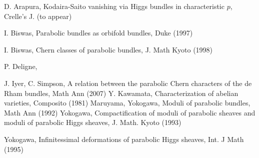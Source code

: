 \documentclass{amsart}
\begin{document}
 \begin{thebibliography}{99}
  D. Arapura, Kodaira-Saito vanishing via Higgs bundles in
   characteristic $p$, Crelle's J. (to appear)

  I. Biswas, Parabolic bundles as orbifold bundles,
   Duke (1997)

  I. Biswas, Chern classes of parabolic bundles,
   J. Math Kyoto (1998)
   
    P. Deligne,
   
   
  J. Iyer, C. Simpson, A relation between the
   parabolic Chern characters of the de Rham bundles, Math Ann (2007)
  Y. Kawamata, Characterization of abelian
   varieties, Composito (1981)
  Maruyama, Yokogawa, Moduli of parabolic bundles,
   Math Ann (1992)
  Yokogawa, Compactification of moduli of parabolic sheaves and
moduli of parabolic Higgs sheaves, J. Math. Kyoto (1993)

 Yokogawa, Infinitessimal deformations of
  parabolic Higgs sheaves, Int. J Math (1995)
 \end{thebibliography}
\end{document}
